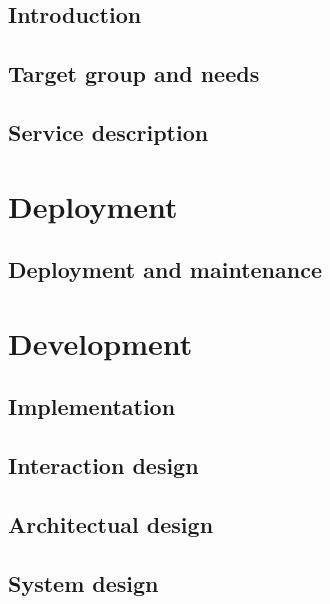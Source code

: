 \frontmatter
\chapter{Introduction}


\chapter{Target group and needs}


\chapter{Service description}


\mainmatter
\part{Deployment}

\chapter{Deployment and maintenance}


\part{Development}

\chapter{Implementation}


\chapter{Interaction design}


\chapter{Architectual design}


\chapter{System design}




%

%


\backmatter

